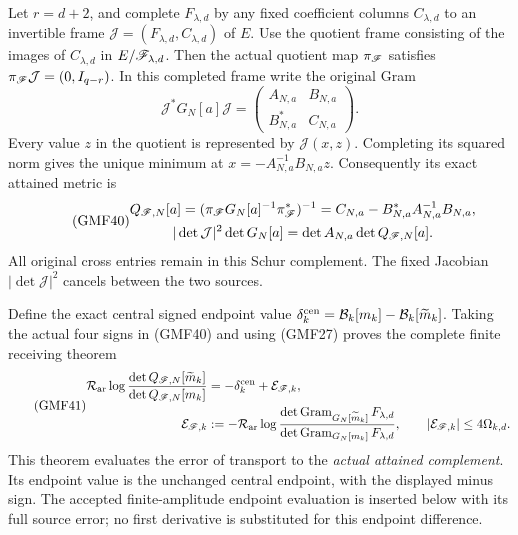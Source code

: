 \documentclass[11pt,a4paper]{article}
\begin{document}
Let \(r=d+2\), and complete \(F_{\lambda,d}\) by any fixed
coefficient columns \(C_{\lambda,d}\) to an invertible frame
\(\mathcal J=(F_{\lambda,d},C_{\lambda,d})\) of \(E\).
Use the quotient frame consisting of the images of
\(C_{\lambda,d}\) in \(E/\mathscr F_{\lambda,d}\).
Then the actual quotient map \(\pi_\mathscr F\) satisfies
\(\pi_\mathscr F\mathcal J=(0,I_{q-r})\).
In this completed frame write the original Gram
\[
 \mathcal J^*G_N[a]\mathcal J=
 \begin{pmatrix}A_{N,a}&B_{N,a}\\B_{N,a}^*&C_{N,a}\end{pmatrix}.
\]
Every value \(z\) in the quotient is represented by
\(\mathcal J(x,z)\).  Completing its squared norm gives
the unique minimum at \(x=-A_{N,a}^{-1}B_{N,a}z\).
Consequently its exact attained metric is
\begin{equation}\tag{GMF40}
\begin{gathered}
 Q_{\mathscr F,N}[a]
 =(\pi_\mathscr F G_N[a]^{-1}\pi_\mathscr F^*)^{-1}
 =C_{N,a}-B_{N,a}^*A_{N,a}^{-1}B_{N,a},\\
 |\det\mathcal J|^2\det G_N[a]
   =\det A_{N,a}\det Q_{\mathscr F,N}[a].
\end{gathered}
\end{equation}
All original cross entries remain in this Schur complement.
The fixed Jacobian \(|\det\mathcal J|^2\) cancels between
the two sources.

Define the exact central signed endpoint value
\(\delta_k^{\rm cen}=\mathcal B_k[m_k]-\mathcal B_k[\widetilde m_k]\).
Taking the actual four signs in (GMF40) and using (GMF27)
proves the complete finite receiving theorem
\begin{equation}\tag{GMF41}
\begin{split}
 \mathcal R_{\rm ar}
 \log\frac{\det Q_{\mathscr F,N}[\widetilde m_k]}
              {\det Q_{\mathscr F,N}[m_k]}
 &=-\delta_k^{\rm cen}+\mathcal E_{\mathscr F,k},\\
 \mathcal E_{\mathscr F,k}
 &:=-\mathcal R_{\rm ar}
 \log\frac{\det\operatorname{Gram}_{G_N[\widetilde m_k]}F_{\lambda,d}}
              {\det\operatorname{Gram}_{G_N[m_k]}F_{\lambda,d}},
 \qquad |\mathcal E_{\mathscr F,k}|\le4\Omega_{k,d}.
\end{split}
\end{equation}
This theorem evaluates the error of transport to the
\emph{actual attained complement}.  Its endpoint value is
the unchanged central endpoint, with the displayed minus
sign.  The accepted finite-amplitude endpoint evaluation is
inserted below with its full source error; no first
derivative is substituted for this endpoint difference.
\end{document}
